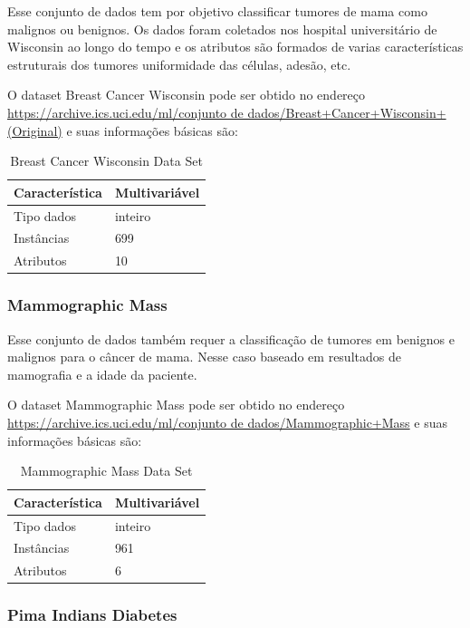 \documentclass[12pt, a4paper]{article}
\begin{document}
Esse conjunto de dados tem por objetivo classificar tumores de mama como malignos ou benignos. Os dados foram coletados nos hospital universitário de Wisconsin ao longo do tempo e os atributos são formados de varias características estruturais dos tumores uniformidade das células, adesão, etc.

O dataset Breast Cancer Wisconsin pode ser obtido no endereço \url{https://archive.ics.uci.edu/ml/conjunto de dados/Breast+Cancer+Wisconsin+(Original)} e suas informações básicas são:
\begin{table}[!ht]
\centering
\caption{Breast Cancer Wisconsin Data Set}
\label{breasttable}
\begin{tabular}{|l|l|}
\hline
Característica & Multivariável\\
\hline
Tipo dados & inteiro \\
\hline
Instâncias & 699 \\
\hline
Atributos & 10\\
\hline
\end{tabular}
\end{table}

\subsubsection{Mammographic Mass}

Esse conjunto de dados também requer a classificação de tumores em benignos e malignos para o câncer de mama. Nesse caso baseado em resultados de mamografia e a idade da paciente.

O dataset Mammographic Mass pode ser obtido no endereço \url{https://archive.ics.uci.edu/ml/conjunto de dados/Mammographic+Mass} e suas informações básicas são:
\begin{table}[!ht]
\centering
\caption{Mammographic Mass Data Set}
\label{mammographictable}
\begin{tabular}{|l|l|}
\hline
Característica & Multivariável\\
\hline
Tipo dados & inteiro \\
\hline
Instâncias & 961 \\
\hline
Atributos & 6\\
\hline
\end{tabular}
\end{table}

\subsubsection{Pima Indians Diabetes}
\end{document}
